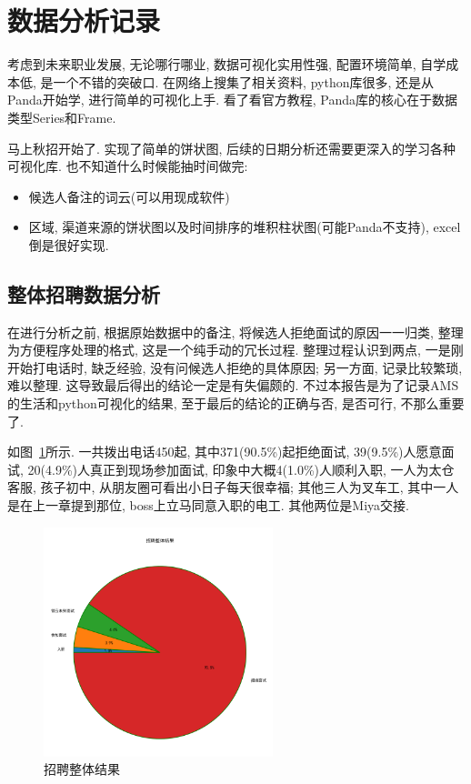 \section{数据分析记录}
考虑到未来职业发展, 无论哪行哪业, 数据可视化实用性强, 配置环境简单, 自学成本低, 是一个不错的突破口. 在网络上搜集了相关资料, python库很多, 还是从Panda开始学, 进行简单的可视化上手. 看了看官方教程, Panda库的核心在于数据类型Series和Frame. 

马上秋招开始了. 实现了简单的饼状图, 后续的日期分析还需要更深入的学习各种可视化库. 也不知道什么时候能抽时间做完:

\begin{itemize}
    \item 候选人备注的词云(可以用现成软件)
    \item 区域, 渠道来源的饼状图以及时间排序的堆积柱状图(可能Panda不支持), excel倒是很好实现.
\end{itemize}

\subsection{整体招聘数据分析}
在进行分析之前, 根据原始数据中的备注, 将候选人拒绝面试的原因一一归类, 整理为方便程序处理的格式, 这是一个纯手动的冗长过程. 整理过程认识到两点, 一是刚开始打电话时, 缺乏经验, 没有问候选人拒绝的具体原因; 另一方面, 记录比较繁琐, 难以整理. 这导致最后得出的结论一定是有失偏颇的. 不过本报告是为了记录AMS的生活和python可视化的结果, 至于最后的结论的正确与否, 是否可行, 不那么重要了.

如图~\ref{fig:0301}所示. 一共拨出电话450起, 其中371(90.5\%)起拒绝面试, 39(9.5\%)人愿意面试, 20(4.9\%)人真正到现场参加面试, 印象中大概4(1.0\%)人顺利入职, 一人为太仓客服, 孩子初中, 从朋友圈可看出小日子每天很幸福; 其他三人为叉车工, 其中一人是在上一章提到那位, boss上立马同意入职的电工. 其他两位是Miya交接. 

\begin{figure}[htbp]
    \centering
    \includegraphics[height=18em]{pic/fig01_trim.png}
    \caption{招聘整体结果}
    \label{fig:0301}
\end{figure}

